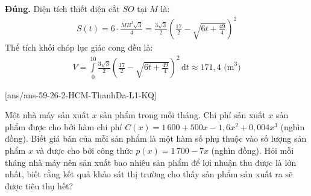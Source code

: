 \begin{ex}
{\begin{itemchoice}
			\itemch \textbf{Đúng.} Diện tích thiết diện cắt $SO$ tại $M$ là: 
			\begin{eqnarray*}
				S(t) = 6 \cdot \frac{MB^2\sqrt{3}}{4} = \frac{3\sqrt{3}}{2} \left( \frac{17}{2} - \sqrt{6t + \frac{49}{4}} \right)^2
			\end{eqnarray*}
			Thể tích khối chóp lục giác cong đều là: 
			\begin{eqnarray*}
				V = \displaystyle\int\limits_{0}^{10} \frac{3\sqrt{3}}{2} \left( \frac{17}{2} - \sqrt{6t + \frac{49}{4}} \right)^2 \mathrm{\,d}t \approx 171{,}4 \text{ (m}^3\text{)}
			\end{eqnarray*}
		\end{itemchoice}
	}
\end{ex}

\caukq
{}[ans/ans-59-26-2-HCM-ThanhDa-L1-KQ]
\begin{ex}%
	Một nhà máy sản xuất $x$ sản phẩm trong mỗi tháng. Chi phí sản xuất $x$ sản phẩm được cho bởi hàm chi phí $C(x) = 1\,600 + 500x - 1{,}6x^2 + 0{,}004x^3$ (nghìn đồng). Biết giá bán của mỗi sản phẩm là một hàm số phụ thuộc vào số lượng sản phẩm $x$ và được cho bởi công thức $p(x) = 1\,700 - 7x$ (nghìn đồng). Hỏi mỗi tháng nhà máy nên sản xuất bao nhiêu sản phẩm để lợi nhuận thu được là lớn nhất, biết rằng kết quả khảo sát thị trường cho thấy sản phẩm sản xuất ra sẽ được tiêu thụ hết?
\end{ex}
